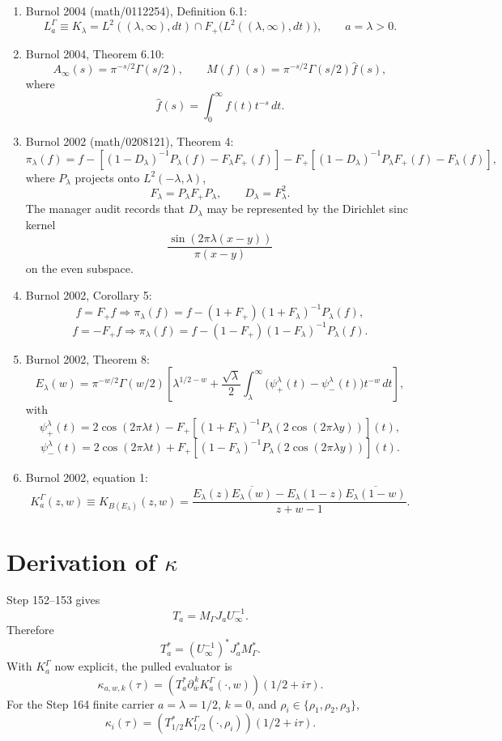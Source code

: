 \documentclass[11pt]{article}
\begin{document}
\begin{enumerate}
\item Burnol 2004 (math/0112254), Definition 6.1:
\[
  L_a^\Gamma \equiv K_\lambda
  =
  L^2((\lambda,\infty),dt)
  \cap
  F_+\bigl(L^2((\lambda,\infty),dt)\bigr),
  \qquad a=\lambda>0.
\]

\item Burnol 2004, Theorem 6.10:
\[
  A_\infty(s)=\pi^{-s/2}\Gamma(s/2),\qquad
  M(f)(s)=\pi^{-s/2}\Gamma(s/2)\widehat f(s),
\]
where
\[
  \widehat f(s)=\int_0^\infty f(t)t^{-s}\,dt.
\]

\item Burnol 2002 (math/0208121), Theorem 4:
\[
\pi_\lambda(f)
=f-\left[(1-D_\lambda)^{-1}P_\lambda(f)-F_\lambda F_+(f)\right]
-F_+\left[(1-D_\lambda)^{-1}P_\lambda F_+(f)-F_\lambda(f)\right],
\]
where \(P_\lambda\) projects onto \(L^2(-\lambda,\lambda)\),
\[
  F_\lambda=P_\lambda F_+P_\lambda,\qquad D_\lambda=F_\lambda^2.
\]
The manager audit records that \(D_\lambda\) may be represented by the
Dirichlet sinc kernel
\[
  \frac{\sin(2\pi\lambda(x-y))}{\pi(x-y)}
\]
on the even subspace.

\item Burnol 2002, Corollary 5:
\[
f=F_+f\Longrightarrow
\pi_\lambda(f)=f-(1+F_+)(1+F_\lambda)^{-1}P_\lambda(f),
\]
\[
f=-F_+f\Longrightarrow
\pi_\lambda(f)=f-(1-F_+)(1-F_\lambda)^{-1}P_\lambda(f).
\]

\item Burnol 2002, Theorem 8:
\[
  E_\lambda(w)=
  \pi^{-w/2}\Gamma(w/2)
  \left[
    \lambda^{1/2-w}
    +
    \frac{\sqrt\lambda}{2}
    \int_\lambda^\infty
      \bigl(\psi_+^\lambda(t)-\psi_-^\lambda(t)\bigr)t^{-w}\,dt
  \right],
\]
with
\[
\psi_+^\lambda(t)
 =
2\cos(2\pi\lambda t)
-
F_+\left[
(1+F_\lambda)^{-1}P_\lambda(2\cos(2\pi\lambda y))
\right](t),
\]
\[
\psi_-^\lambda(t)
 =
2\cos(2\pi\lambda t)
+
F_+\left[
(1-F_\lambda)^{-1}P_\lambda(2\cos(2\pi\lambda y))
\right](t).
\]

\item Burnol 2002, equation 1:
\[
K_a^\Gamma(z,w)
\equiv
K_{B(E_\lambda)}(z,w)
=
\frac{
E_\lambda(z)\overline{E_\lambda(w)}
-
E_\lambda(1-z)\overline{E_\lambda(1-w)}
}{z+w-1}.
\]
\end{enumerate}

\section*{Derivation of \(\kappa\)}

Step 152--153 gives
\[
  T_a=M_\Gamma J_aU_\infty^{-1}.
\]
Therefore
\[
  T_a^*=(U_\infty^{-1})^*J_a^*M_\Gamma^*.
\]
With \(K_a^\Gamma\) now explicit, the pulled evaluator is
\[
  \kappa_{a,w,k}(\tau)
  =
  \left(
  T_a^*\partial_{\overline w}^{\,k}K_a^\Gamma(\cdot,w)
  \right)(1/2+i\tau).
\]
For the Step 164 finite carrier \(a=\lambda=1/2\), \(k=0\), and
\(\rho_i\in\{\rho_1,\rho_2,\rho_3\}\),
\[
  \kappa_i(\tau)=
  \left(
  T_{1/2}^*K_{1/2}^\Gamma(\cdot,\rho_i)
  \right)(1/2+i\tau).
\]
\end{document}
